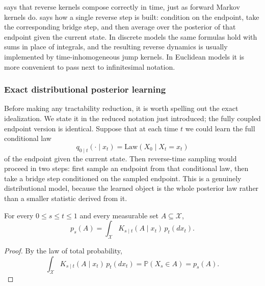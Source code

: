  says that reverse kernels compose correctly in time, just as forward Markov kernels do.
 says how a single reverse step is built:
condition on the endpoint, take the corresponding bridge step, and then average over the posterior of that endpoint given the current state.
In discrete models the same formulas hold with sums in place of integrals, and the resulting reverse dynamics is usually implemented by time-inhomogeneous jump kernels.
In Euclidean models it is more convenient to pass next to infinitesimal notation.

\subsubsection{Exact distributional posterior learning}

Before making any tractability reduction, it is worth spelling out the exact idealization.
We state it in the reduced notation just introduced; the fully coupled endpoint version is identical.
Suppose that at each time \(t\) we could learn the full conditional law
\[
  q_{0\mid t}(\cdot\mid x_t)=\mathrm{Law}(X_0\mid X_t=x_t)
\]
of the endpoint given the current state.
Then reverse-time sampling would proceed in two steps:
first sample an endpoint from that conditional law, then take a bridge step conditioned on the sampled endpoint.
This is a genuinely distributional model, because the learned object is the whole posterior law rather than a smaller statistic derived from it.

\begin{proposition}
\label{prop:reverse-kernels-transport-general}
For every \(0\le s\le t\le 1\) and every measurable set \(A\subseteq\mathcal{X}\),
\[
  p_s(A)
  =
  \int_{\mathcal{X}} K_{s\mid t}(A\mid x_t)\,p_t(dx_t).
\]
\end{proposition}
\begin{proof}
By the law of total probability,
\[
  \int_{\mathcal{X}} K_{s\mid t}(A\mid x_t)\,p_t(dx_t)
  =
  \mathbb{P}(X_s\in A)
  =
  p_s(A).
\]
\end{proof}

